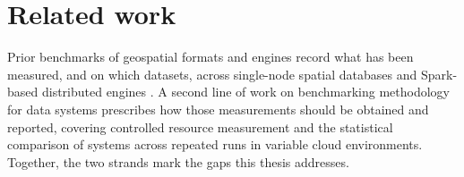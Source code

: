 \section{Related work}
\label{introduction:related-work}
Prior benchmarks of geospatial formats and engines record what has been measured, and on which datasets, across single-node spatial databases and Spark-based distributed engines \parencite{ray2011_jackpine_spatial_database_benchmark, pandey2018_how_good_modern_spatial_analytics}. A second line of work on benchmarking methodology for data systems prescribes how those measurements should be obtained and reported, covering controlled resource measurement and the statistical comparison of systems across repeated runs in variable cloud environments. Together, the two strands mark the gaps this thesis addresses.